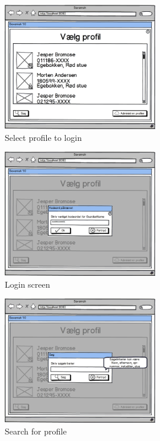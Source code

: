 \begin{figure}[H]
	\centering
		\includegraphics[width=0.60\textwidth]{images/Mocks/1-selectProfile.png}
	\caption{Select profile to login}
	\label{fig:1-selectProfile}
\end{figure}

\begin{figure}[H]
	\centering
		\includegraphics[width=0.60\textwidth]{images/Mocks/11-Login.png}
	\caption{Login screen}
	\label{fig:11-Login}
\end{figure}

\begin{figure}[H]
	\centering
		\includegraphics[width=0.60\textwidth]{images/Mocks/12-Search.png}
	\caption{Search for profile}
	\label{fig:12-Search}
\end{figure}

